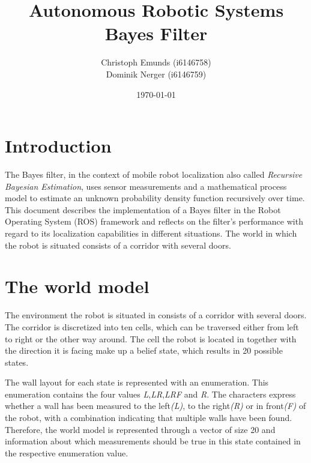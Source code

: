 \documentclass[10pt,a4paper]{article}
\author{Christoph Emunds (i6146758)\\Dominik Nerger (i6146759)}
\title{Autonomous Robotic Systems\\Bayes Filter}
\date{\today}
\begin{document}
	\maketitle
	
	\tableofcontents
	
	\section{Introduction}
	The Bayes filter, in the context of mobile robot localization also called \textit{Recursive Bayesian Estimation}, uses sensor measurements and a mathematical process model to estimate an unknown probability density function recursively over time.	This document describes the implementation of a Bayes filter in the Robot Operating System (ROS) framework and reflects on the filter's performance with regard to its localization capabilities in different situations. The world in which the robot is situated consists of a corridor with several doors.
	
		
	\section{The world model}
	The environment the robot is situated in consists of a corridor with several doors. The corridor is discretized into ten cells, which can be traversed either from left to right or the other way around. The cell the robot is located in together with the direction it is facing make up a belief state, which results in 20 possible states.
	
	
	The wall layout for each state is represented with an enumeration. This enumeration contains the four values \textit{L},\textit{LR},\textit{LRF} and \textit{R}. The characters express whether a wall has been measured to the left\textit{(L)}, to the right\textit{(R)} or in front\textit{(F)} of the robot, with a combination indicating that multiple walls have been found. Therefore, the world model is represented through a vector of size 20 and information about which measurements should be true in this state contained in the respective enumeration value.
	
\end{document}
